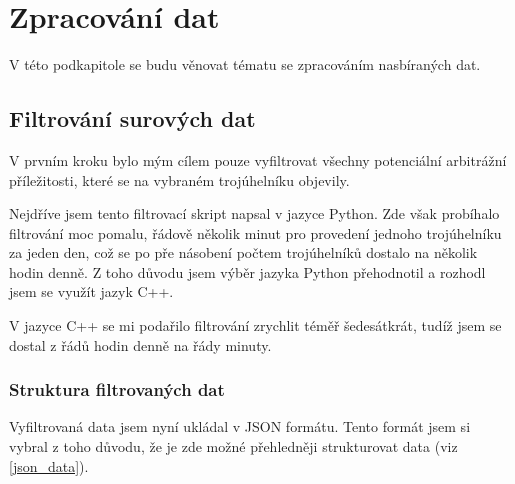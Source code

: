 \documentclass[thesis=B,czech]{FITthesis}[2019/03/21]
\begin{document}

\section{Zpracování dat}
V této podkapitole se budu věnovat tématu se zpracováním nasbíraných dat.

\subsection{Filtrování surových dat}
V prvním kroku bylo mým cílem pouze vyfiltrovat všechny potenciální arbitrážní příležitosti, které se na vybraném trojúhelníku objevily.

Nejdříve jsem tento filtrovací skript napsal v jazyce Python. Zde však probíhalo filtrování moc pomalu, řádově několik minut pro provedení jednoho trojúhelníku za jeden den, což se po pře násobení počtem trojúhelníků dostalo na několik hodin denně. Z toho důvodu jsem výběr jazyka Python přehodnotil a rozhodl jsem se využít jazyk C++. 

V jazyce C++ se mi podařilo filtrování zrychlit téměř šedesátkrát, tudíž jsem se dostal z řádů hodin denně na řády minuty.

\subsubsection{Struktura filtrovaných dat}
Vyfiltrovaná data jsem nyní ukládal v JSON formátu. Tento formát jsem si vybral z toho důvodu, že je zde možné přehledněji strukturovat data (viz \ref{json_data}).
\end{document}
